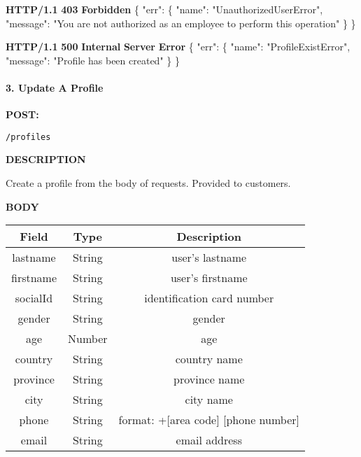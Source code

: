 \documentclass[
]{article}
\newenvironment{Shaded}{}{}
\newcommand{\DataTypeTok}[1]{\textcolor[rgb]{0.56,0.13,0.00}{#1}}
\newcommand{\ErrorTok}[1]{\textcolor[rgb]{1.00,0.00,0.00}{\textbf{#1}}}
\newcommand{\FunctionTok}[1]{\textcolor[rgb]{0.02,0.16,0.49}{#1}}
\newcommand{\StringTok}[1]{\textcolor[rgb]{0.25,0.44,0.63}{#1}}
\begin{document}
\begin{Shaded}
\begin{Highlighting}[]
\ErrorTok{HTTP/1.1} \ErrorTok{403} \ErrorTok{Forbidden}
\FunctionTok{\{}
    \DataTypeTok{"err"}\FunctionTok{:} \FunctionTok{\{}
        \DataTypeTok{"name"}\FunctionTok{:} \StringTok{"UnauthorizedUserError"}\FunctionTok{,}
        \DataTypeTok{"message"}\FunctionTok{:} \StringTok{"You are not authorized as an employee to perform this operation"}
    \FunctionTok{\}}
\FunctionTok{\}}
\end{Highlighting}
\end{Shaded}

\begin{Shaded}
\begin{Highlighting}[]
\ErrorTok{HTTP/1.1} \ErrorTok{500} \ErrorTok{Internal} \ErrorTok{Server} \ErrorTok{Error}
\FunctionTok{\{}
    \DataTypeTok{"err"}\FunctionTok{:} \FunctionTok{\{}
        \DataTypeTok{"name"}\FunctionTok{:} \StringTok{"ProfileExistError"}\FunctionTok{,}
        \DataTypeTok{"message"}\FunctionTok{:} \StringTok{"Profile has been created"}
    \FunctionTok{\}}
\FunctionTok{\}}
\end{Highlighting}
\end{Shaded}

\hypertarget{header-n289}{%
\paragraph{3. Update A Profile}\label{header-n289}}

\textbf{POST:}

\begin{verbatim}
/profiles
\end{verbatim}

\textbf{DESCRIPTION}

Create a profile from the body of requests. Provided to customers.

\textbf{BODY}

\begin{longtable}[]{@{}ccc@{}}
\toprule
Field & Type & Description\tabularnewline
\midrule
\endhead
lastname & String & user's lastname\tabularnewline
firstname & String & user's firstname\tabularnewline
socialId & String & identification card number\tabularnewline
gender & String & gender\tabularnewline
age & Number & age\tabularnewline
country & String & country name\tabularnewline
province & String & province name\tabularnewline
city & String & city name\tabularnewline
phone & String & format: +{[}area code{]} {[}phone
number{]}\tabularnewline
email & String & email address\tabularnewline
\bottomrule
\end{longtable}
\end{document}
